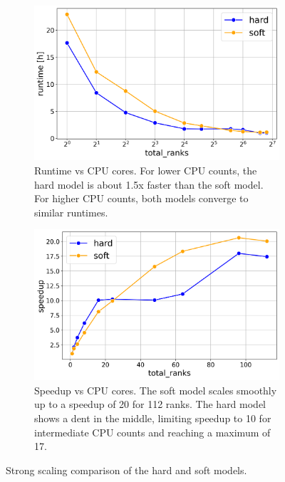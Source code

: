 \documentclass[conference]{IEEEtran}
\begin{document}
\begin{figure}[H]
    \centering
    \begin{subfigure}[b]{1\linewidth}
        \includegraphics[width=\linewidth]{figures/runtimes/strong_scaling_hard_soft.png}
        \caption{Runtime vs CPU cores. For lower CPU counts, the hard model is about 1.5x faster than the soft model. For higher CPU counts, both models converge to similar runtimes.}
        \label{fig:runtime_hard_soft}
    \end{subfigure}

    \vspace{0.5cm}  %

    \begin{subfigure}[b]{1\linewidth}
        \includegraphics[width=\linewidth]{figures/runtimes/strong_scaling_efficiency_hard_soft.png}
        \caption{Speedup vs CPU cores. The soft model scales smoothly up to a speedup of 20 for 112 ranks. The hard model shows a dent in the middle, limiting speedup to 10 for intermediate CPU counts and reaching a maximum of 17.}
        \label{fig:speedup_hard_soft}
    \end{subfigure}

    \caption{Strong scaling comparison of the hard and soft models.}
\end{figure}
\end{document}
